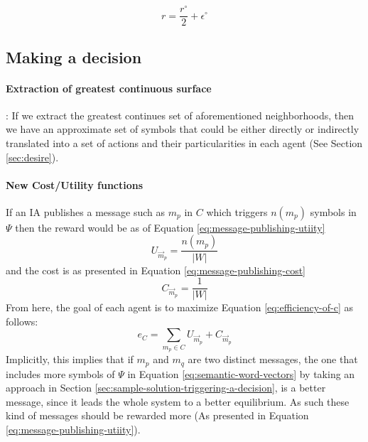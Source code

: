 \documentclass{article}
\begin{document}
\begin{multicols}{2}
			\begin{equation}
				r = \frac{r^{\circ}}{2} + \epsilon^{\circ}
				\label{eq:general-neigborhood-radius}
			\end{equation}
		
			\subsection{Making a decision} 
				\paragraph{Extraction of greatest continuous surface}: If we extract the greatest continues set of aforementioned neighborhoods, then we have an approximate set of symbols that could be either directly or indirectly translated into a set of actions and their particularities in each agent (See Section \ref{sec:desire}).
			\paragraph{New Cost/Utility functions} 
				If an IA publishes a message such as $m_p$ in $C$ which triggers $n(m_p)$ symbols in $\Psi$ then the reward would be as of Equation \ref{eq:message-publishing-utiity}
				\begin{equation}
					U_{\vec{m}_p} = \frac{n(m_p)}{|W|}
					\label{eq:message-publishing-utiity}
				\end{equation}
				and the cost is as presented in Equation \ref{eq:message-publishing-cost}
				\begin{equation}
					C_{\vec{m}_p} = \frac{1}{|W|}
					\label{eq:message-publishing-cost}
				\end{equation}
				From here, the goal of each agent is to maximize Equation \ref{eq:efficiency-of-c} as follows:
				\begin{equation}
					e_{C} = \sum\limits_{m_p \in C} U_{\vec{m}_p} + C_{\vec{m}_p}
					\label{eq:efficiency-of-c}
				\end{equation}
				Implicitly, this implies that if $m_p$ and $m_q$ are two distinct messages, the one that includes more symbols of $\Psi$ in Equation \ref{eq:semantic-word-vectors} by taking an approach in Section \ref{sec:sample-solution-triggering-a-decision}, is a better message, since it leads the whole system to a better equilibrium. As such these kind of messages should be rewarded more (As presented in Equation \ref{eq:message-publishing-utiity}).
		

\end{multicols}
\end{document}
